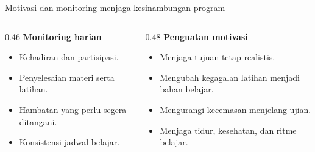 \begin{frame}[shrink=7]{Motivasi dan monitoring menjaga kesinambungan program}
  \begin{columns}[T,onlytextwidth]
    \begin{column}{0.46\textwidth}
      {\color{StudentBlue}\bfseries Monitoring harian}\par
      \begin{itemize}
        \item Kehadiran dan partisipasi.
        \item Penyelesaian materi serta latihan.
        \item Hambatan yang perlu segera ditangani.
        \item Konsistensi jadwal belajar.
      \end{itemize}
    \end{column}
    \begin{column}{0.48\textwidth}
      {\color{StudentBlue}\bfseries Penguatan motivasi}\par
      \begin{itemize}
        \item Menjaga tujuan tetap realistis.
        \item Mengubah kegagalan latihan menjadi bahan belajar.
        \item Mengurangi kecemasan menjelang ujian.
        \item Menjaga tidur, kesehatan, dan ritme belajar.
      \end{itemize}
    \end{column}
  \end{columns}
  \vspace{0.14cm}
\end{frame}

